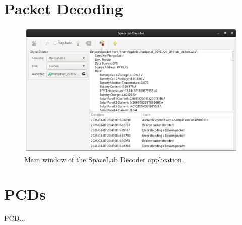 \section{Packet Decoding}

\cite{spacelab-decoder}

\begin{figure}[!ht]
    \begin{center}
        \includegraphics[width=\textwidth]{figures/spacelab-decoder.png}
        \caption{Main window of the SpaceLab Decoder application.}
        \label{fig:spacelab-decoder}
    \end{center}
\end{figure}

\section{PCDs}

PCD...
